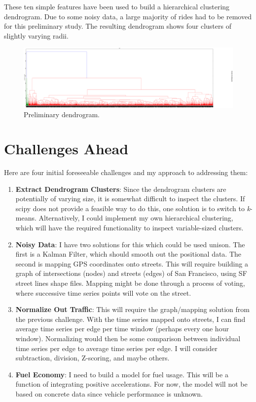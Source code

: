 \documentclass[12pt]{article}
\begin{document}
These ten simple features have been used to build a hierarchical clustering dendrogram. Due to some noisy data, a large majority of rides had to be removed for this preliminary study. The resulting dendrogram shows four clusters of slightly varying radii.

\begin{figure}[hbtp]
\caption{\label{fig:dendrogram}Preliminary dendrogram.}
\begin{center}
\includegraphics[width=5.5in]{dendro.png}
\end{center}
\end{figure}

\section{Challenges Ahead}

Here are four initial foreseeable challenges and my approach to addressing them:

\begin{enumerate}
\item \textbf{Extract Dendrogram Clusters}: Since the dendrogram clusters are potentially of varying size, it is somewhat difficult to inspect the clusters. If scipy does not provide a feasible way to do this, one solution is to switch to \textit{k}-means. Alternatively, I could implement my own hierarchical clustering, which will have the required functionality to inspect variable-sized clusters.
\item \textbf{Noisy Data}: I have two solutions for this which could be used unison. The first is a Kalman Filter, which should smooth out the positional data. The second is mapping GPS coordinates onto streets. This will require building a graph of intersections (nodes) and streets (edges) of San Francisco, using SF street lines shape files. Mapping might be done through a process of voting, where successive time series points will vote on the street.
\item \textbf{Normalize Out Traffic}: This will require the graph/mapping solution from the previous challenge. With the time series mapped onto streets, I can find average time series per edge per time window (perhaps every one hour window). Normalizing would then be some comparison between individual time series per edge to average time series per edge. I will consider subtraction, division, Z-scoring, and maybe others.
\item \textbf{Fuel Economy}: I need to build a model for fuel usage. This will be a function of integrating positive accelerations. For now, the model will not be based on concrete data since vehicle performance is unknown.
\end{enumerate}
\end{document}
